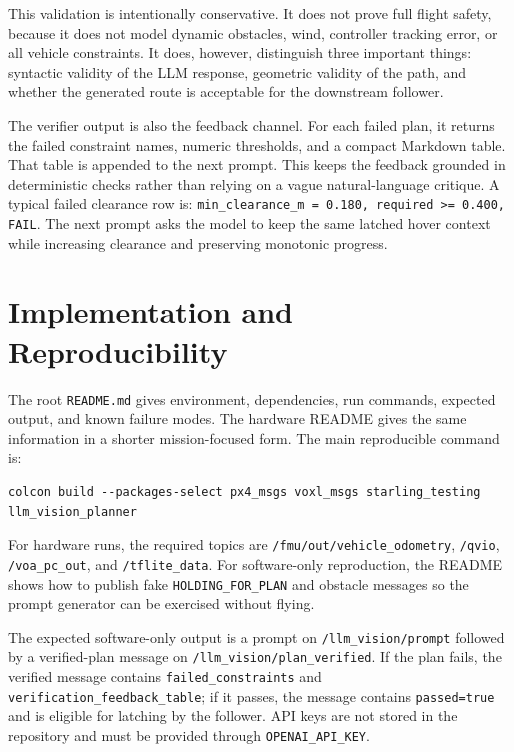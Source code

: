 \documentclass[12pt]{article}
\begin{document}
This validation is intentionally conservative. It does not prove full flight safety, because it does not model dynamic obstacles, wind, controller tracking error, or all vehicle constraints. It does, however, distinguish three important things: syntactic validity of the LLM response, geometric validity of the path, and whether the generated route is acceptable for the downstream follower.

The verifier output is also the feedback channel. For each failed plan, it returns the failed constraint names, numeric thresholds, and a compact Markdown table. That table is appended to the next prompt. This keeps the feedback grounded in deterministic checks rather than relying on a vague natural-language critique. A typical failed clearance row is: \texttt{min\_clearance\_m = 0.180, required >= 0.400, FAIL}. The next prompt asks the model to keep the same latched hover context while increasing clearance and preserving monotonic progress.

\section{Implementation and Reproducibility}

The root \texttt{README.md} gives environment, dependencies, run commands, expected output, and known failure modes. The hardware README gives the same information in a shorter mission-focused form. The main reproducible command is:

\begin{verbatim}
colcon build --packages-select px4_msgs voxl_msgs starling_testing llm_vision_planner
\end{verbatim}

For hardware runs, the required topics are \texttt{/fmu/out/vehicle\_odometry}, \texttt{/qvio}, \texttt{/voa\_pc\_out}, and \texttt{/tflite\_data}. For software-only reproduction, the README shows how to publish fake \texttt{HOLDING\_FOR\_PLAN} and obstacle messages so the prompt generator can be exercised without flying.

The expected software-only output is a prompt on \texttt{/llm\_vision/prompt} followed by a verified-plan message on \texttt{/llm\_vision/plan\_verified}. If the plan fails, the verified message contains \texttt{failed\_constraints} and \texttt{verification\_feedback\_table}; if it passes, the message contains \texttt{passed=true} and is eligible for latching by the follower. API keys are not stored in the repository and must be provided through \texttt{OPENAI\_API\_KEY}.
\end{document}

